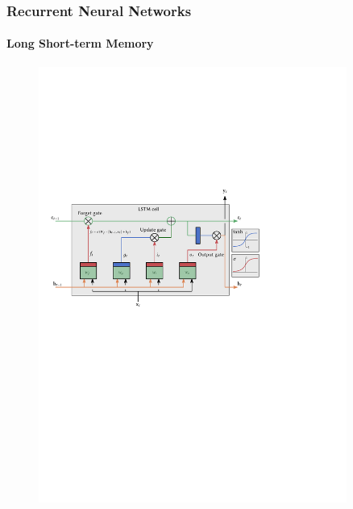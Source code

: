 \documentclass[aspectratio=169]{beamer}
\begin{document}
\begin{frame}
	\frametitle{Recurrent Neural Networks}
	\framesubtitle{Long Short-term Memory}
	
	\begin{figure}
		\includegraphics[width=0.9\textwidth]{lstm-cell}
	\end{figure}
	
\end{frame}
\end{document}
